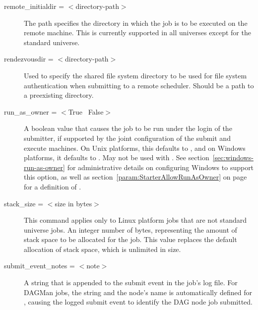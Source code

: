\begin{description}
\label{man-condor-submit-remote-initialdir}
\item[remote\_initialdir = $<$directory-path$>$]
The path specifies the directory in which the job is to be
executed on the remote machine.  This is currently supported in all
universes except for the standard universe.


\label{man-condor-submit-rendezvousdir}
\item[rendezvousdir = $<$directory-path$>$] Used to specify the
shared file system directory to be used for file system authentication
when submitting to a remote scheduler.  Should be a path to a preexisting
directory.



\label{man-condor-submit-run-as-owner}
\item[run\_as\_owner = $<$True \Bar\ False$>$]
A boolean value that causes the job to be run under the login of 
the submitter,
if supported by the joint configuration of the submit and execute machines.
On Unix platforms, this defaults to ,
and on Windows platforms, it defaults to .
May not be used with .
See section~\ref{sec:windows-run-as-owner} for administrative details on
configuring Windows to support this option, as well as 
section~\ref{param:StarterAllowRunAsOwner}
on page~\pageref{param:StarterAllowRunAsOwner} for a definition of
.


\label{man-condor-submit-stack-size}
\item[stack\_size = $<$size in bytes$>$]
This command applies only to Linux platform jobs that are not standard
universe jobs.
An integer number of bytes, representing the amount of stack space to be 
allocated for the job.
This value replaces the default allocation of stack space,
which is unlimited in size.


\label{man-condor-submit-submit-event-notes}
\item[submit\_event\_notes = $<$note$>$]
A string that is appended to the submit event in the job's log file.
For DAGMan jobs, the string  and the node's name is
automatically defined for ,
causing the logged submit event to identify the DAG node job submitted. 


\end{description}
